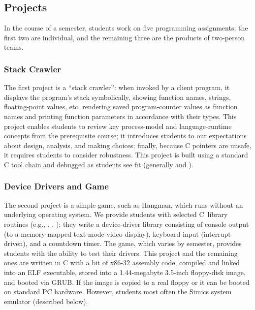 \subsection{Projects}

In the course of a semester, students work on five
programming assignments; the first two are individual,
and the remaining three are the products of two-person
teams.

\subsubsection{Stack Crawler}
The first project is a ``stack crawler'':  when invoked by
a client program, it displays the program's stack
symbolically,
\shortversion
{showing function names, strings, floating-point values, etc.}
{rendering saved program-counter values
as function names and printing function parameters
in accordance with their types.}
This project
enables students to review key process-model and
language-runtime concepts from the
prerequisite course;
it introduces students to our expectations about
design, analysis, and making choices;
finally,
because C pointers are unsafe, it requires students
to consider robustness.
%
This project is built using a standard C tool chain
and debugged as students see fit (generally
 and ).

\subsubsection{Device Drivers and Game}
The second project is a simple game, such as Hangman,
which runs without an underlying
operating system.
We provide students with selected C~library routines
(e.g., , , );
they write a device-driver library consisting of
console output (to a memory-mapped text-mode video display),
keyboard input (interrupt driven),
and a countdown timer.
{The game, which varies by semester, provides students
with the ability to test their drivers.}
%
%
This project and the remaining ones are written in
C with a bit of x86-32 assembly code,
compiled and linked into an ELF executable,
stored into a 1.44-megabyte 3.5-inch floppy-disk image,
and booted via GRUB.
If the  image is copied to a real floppy
or 
it can be booted on standard PC hardware.
However, students most often  the Simics system emulator (described below).

